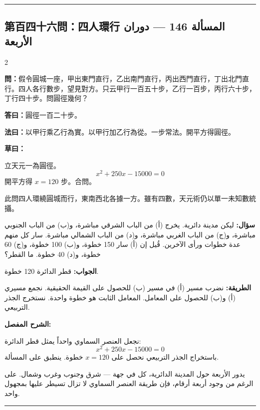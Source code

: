 \documentclass[11pt,a4paper]{article}
\newcommand{\ar}[1]{\arabicfont\beginR #1\endR}
\newcommand{\arb}[1]{\textbf{\arabicfont\beginR #1\endR}}
\newcommand{\longline}{\noindent\rule{\textwidth}{0.4pt}}
\newcommand{\arnote}[1]{\textcolor{arabicblue}{\ar{#1}}}
\newcommand{\wen}[1]{\par\noindent\textbf{\textcolor{probcolor}{問：}}{#1}\par}
\newcommand{\da}[1]{\par\noindent\textbf{\textcolor{anscolor}{答曰：}}{#1}\par}
\newcommand{\fayue}[1]{\par\noindent\textbf{\textcolor{methodcolor}{法曰：}}{#1}\par}
\newcommand{\caoyue}[1]{\par\noindent\textbf{草曰：}{#1}\par}
\newcommand{\arwen}[1]{\par\noindent\arb{سؤال: }\arnote{#1}\par}
\newcommand{\arjwb}[1]{\par\noindent\arb{الجواب: }\arnote{#1}\par}
\newcommand{\arqwd}[1]{\par\noindent\arb{الطريقة: }\arnote{#1}\par}
\newcommand{\arshr}[1]{\par\noindent\arb{الشرح المفصل: }\arnote{#1}\par}
\begin{document}
\vspace{0.3cm}
\longline

\subsection*{第百四十六問：四人環行 \hfill \ar{المسألة 146 — دوران الأربعة}}

\begin{paracol}{2}

\begin{leftcolumn}
\wen{假令圓城一座，甲出東門直行，乙出南門直行，丙出西門直行，丁出北門直行。四人各行數步，望見對方。只云甲行一百五十步，乙行一百步，丙行六十步，丁行四十步。問圓徑幾何？}

\da{圓徑一百二十步。}

\fayue{以甲行乘乙行為實。以甲行加乙行為從。一步常法。開平方得圓徑。}

\caoyue{
立天元一為圓徑。
$$x^2 + 250x - 15000 = 0$$
開平方得 $x = 120$ 步。合問。

此問四人環繞圓城而行，東南西北各據一方。雖有四數，天元術仍以單一未知數統攝。}
\end{leftcolumn}

\begin{rightcolumn}
\arwen{ليكن مدينة دائرية. يخرج (أ) من الباب الشرقي مباشرة، و(ب) من الباب الجنوبي مباشرة، و(ج) من الباب الغربي مباشرة، و(د) من الباب الشمالي مباشرة. سار كل منهم عدة خطوات ورأى الآخرين. قُيل إن (أ) سار 150 خطوة، و(ب) 100 خطوة، و(ج) 60 خطوة، و(د) 40 خطوة. ما القطر؟}

\arjwb{قطر الدائرة 120 خطوة.}

\arqwd{نضرب مسير (أ) في مسير (ب) للحصول على القيمة الحقيقية. نجمع مسيري (أ) و(ب) للحصول على المعامل. المعامل الثابت هو خطوة واحدة. نستخرج الجذر التربيعي.}

\arshr{نجعل العنصر السماوي واحداً يمثل قطر الدائرة:
$$x^2 + 250x - 15000 = 0$$
باستخراج الجذر التربيعي نحصل على $x = 120$ خطوة. ينطبق على المسألة.

يدور الأربعة حول المدينة الدائرية، كل في جهة — شرق وجنوب وغرب وشمال. على الرغم من وجود أربعة أرقام، فإن طريقة العنصر السماوي لا تزال تسيطر عليها بمجهول واحد.}
\end{rightcolumn}

\end{paracol}

\vspace{0.3cm}
\longline
\end{document}

